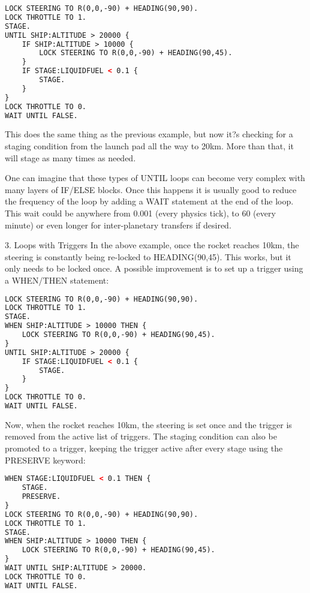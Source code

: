 \begin{lstlisting}[frame=single,language=XML]
LOCK STEERING TO R(0,0,-90) + HEADING(90,90).
LOCK THROTTLE TO 1.
STAGE.
UNTIL SHIP:ALTITUDE > 20000 {
    IF SHIP:ALTITUDE > 10000 {
        LOCK STEERING TO R(0,0,-90) + HEADING(90,45).
    }
    IF STAGE:LIQUIDFUEL < 0.1 {
        STAGE.
    }
}
LOCK THROTTLE TO 0.
WAIT UNTIL FALSE.
\end{lstlisting} 

This does the same thing as the previous example, but now it?s checking for a staging condition from the launch pad all the way to 20km. More than that, it will stage as many times as needed.

One can imagine that these types of UNTIL loops can become very complex with many layers of IF/ELSE blocks. Once this happens it is usually good to reduce the frequency of the loop by adding a WAIT statement at the end of the loop. This wait could be anywhere from 0.001 (every physics tick), to 60 (every minute) or even longer for inter-planetary transfers if desired.

3. Loops with Triggers
In the above example, once the rocket reaches 10km, the steering is constantly being re-locked to HEADING(90,45). This works, but it only needs to be locked once. A possible improvement is to set up a trigger using a WHEN/THEN statement:

\begin{lstlisting}[frame=single,language=XML]
LOCK STEERING TO R(0,0,-90) + HEADING(90,90).
LOCK THROTTLE TO 1.
STAGE.
WHEN SHIP:ALTITUDE > 10000 THEN {
    LOCK STEERING TO R(0,0,-90) + HEADING(90,45).
}
UNTIL SHIP:ALTITUDE > 20000 {
    IF STAGE:LIQUIDFUEL < 0.1 {
        STAGE.
    }
}
LOCK THROTTLE TO 0.
WAIT UNTIL FALSE.
\end{lstlisting} 

Now, when the rocket reaches 10km, the steering is set once and the trigger is removed from the active list of triggers. The staging condition can also be promoted to a trigger, keeping the trigger active after every stage using the PRESERVE keyword:

\begin{lstlisting}[frame=single,language=XML]
WHEN STAGE:LIQUIDFUEL < 0.1 THEN {
    STAGE.
    PRESERVE.
}
LOCK STEERING TO R(0,0,-90) + HEADING(90,90).
LOCK THROTTLE TO 1.
STAGE.
WHEN SHIP:ALTITUDE > 10000 THEN {
    LOCK STEERING TO R(0,0,-90) + HEADING(90,45).
}
WAIT UNTIL SHIP:ALTITUDE > 20000.
LOCK THROTTLE TO 0.
WAIT UNTIL FALSE.
\end{lstlisting} 

